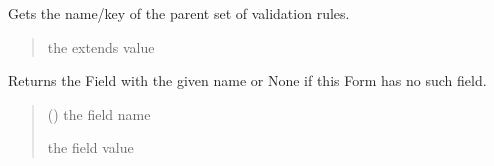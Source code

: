 \documentclass[letterpaper,10pt,english]{sphinxmanual}
\begin{document}
\begin{fulllineitems}
\begin{fulllineitems}
\label{\detokenize{apache_commons_validator_python:apache_commons_validator_python.form_new.Form.get_extends}}
\pysigstartsignatures
{}
\pysigstopsignatures
\sphinxAtStartPar
Gets the name/key of the parent set of validation rules.
\begin{quote}\begin{description}
\sphinxAtStartPar
the extends value

\end{description}\end{quote}

\end{fulllineitems}


\begin{fulllineitems}
\label{\detokenize{apache_commons_validator_python:apache_commons_validator_python.form_new.Form.get_field}}
\pysigstartsignatures
{}
\pysigstopsignatures
\sphinxAtStartPar
Returns the Field with the given name or None if this Form has no such field.
\begin{quote}\begin{description}
\sphinxAtStartPar
{} () \textendash{} the field name

\sphinxAtStartPar
the field value

\end{description}\end{quote}

\end{fulllineitems}



\end{fulllineitems}
\end{document}
